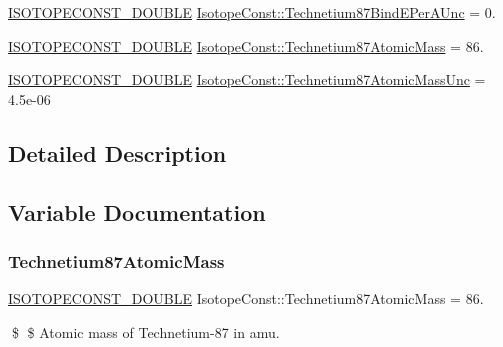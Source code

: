\begin{DoxyCompactItemize}
\mbox{\hyperlink{group___isotope_const-_macros_ga8f45a7272ce02c0b4c65c44636ed719a}{I\+S\+O\+T\+O\+P\+E\+C\+O\+N\+S\+T\+\_\+\+D\+O\+U\+B\+LE}} \mbox{\hyperlink{group___isotope_const-_technetium-_tc87_ga5df0ec1732f8594810e5455b95135b24}{Isotope\+Const\+::\+Technetium87\+Bind\+E\+Per\+A\+Unc}} = 0.
\item 
\mbox{\hyperlink{group___isotope_const-_macros_ga8f45a7272ce02c0b4c65c44636ed719a}{I\+S\+O\+T\+O\+P\+E\+C\+O\+N\+S\+T\+\_\+\+D\+O\+U\+B\+LE}} \mbox{\hyperlink{group___isotope_const-_technetium-_tc87_ga394f461a7b581b202b26100b3d767025}{Isotope\+Const\+::\+Technetium87\+Atomic\+Mass}} = 86.
\item 
\mbox{\hyperlink{group___isotope_const-_macros_ga8f45a7272ce02c0b4c65c44636ed719a}{I\+S\+O\+T\+O\+P\+E\+C\+O\+N\+S\+T\+\_\+\+D\+O\+U\+B\+LE}} \mbox{\hyperlink{group___isotope_const-_technetium-_tc87_ga2cf08a47a596fd31eb0c257aed2ec042}{Isotope\+Const\+::\+Technetium87\+Atomic\+Mass\+Unc}} = 4.\+5e-\/06
\end{DoxyCompactItemize}


\subsection{Detailed Description}


\subsection{Variable Documentation}
\mbox{\label{group___isotope_const-_technetium-_tc87_ga394f461a7b581b202b26100b3d767025}} 
\subsubsection{\texorpdfstring{Technetium87\+Atomic\+Mass}{Technetium87AtomicMass}}
{\footnotesize\ttfamily \mbox{\hyperlink{group___isotope_const-_macros_ga8f45a7272ce02c0b4c65c44636ed719a}{I\+S\+O\+T\+O\+P\+E\+C\+O\+N\+S\+T\+\_\+\+D\+O\+U\+B\+LE}} Isotope\+Const\+::\+Technetium87\+Atomic\+Mass = 86.}

\$ \$ Atomic mass of Technetium-\/87 in amu. \mbox{\label{group___isotope_const-_technetium-_tc87_ga2cf08a47a596fd31eb0c257aed2ec042}} 
